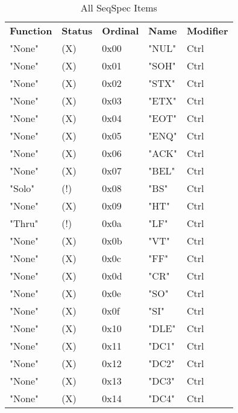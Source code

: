    \begin{table}[htb]
      \centering
      \caption{All SeqSpec Items}
      \label{table:seqspec_items_all}
      \begin{tabular}{l l l l l}
        \textbf{Function} & \textbf{Status} & \textbf{Ordinal} & \textbf{Name} & \textbf{Modifier} \\
        "None"               & (X)  &  0x00   & "NUL"        & Ctrl \\
        "None"               & (X)  &  0x01   & "SOH"        & Ctrl \\
        "None"               & (X)  &  0x02   & "STX"        & Ctrl \\
        "None"               & (X)  &  0x03   & "ETX"        & Ctrl \\
        "None"               & (X)  &  0x04   & "EOT"        & Ctrl \\
        "None"               & (X)  &  0x05   & "ENQ"        & Ctrl \\
        "None"               & (X)  &  0x06   & "ACK"        & Ctrl \\
        "None"               & (X)  &  0x07   & "BEL"        & Ctrl \\
        "Solo"               & (!)  &  0x08   & "BS"         & Ctrl \\
        "None"               & (X)  &  0x09   & "HT"         & Ctrl \\
        "Thru"               & (!)  &  0x0a   & "LF"         & Ctrl \\
        "None"               & (X)  &  0x0b   & "VT"         & Ctrl \\
        "None"               & (X)  &  0x0c   & "FF"         & Ctrl \\
        "None"               & (X)  &  0x0d   & "CR"         & Ctrl \\
        "None"               & (X)  &  0x0e   & "SO"         & Ctrl \\
        "None"               & (X)  &  0x0f   & "SI"         & Ctrl \\
        "None"               & (X)  &  0x10   & "DLE"        & Ctrl \\
        "None"               & (X)  &  0x11   & "DC1"        & Ctrl \\
        "None"               & (X)  &  0x12   & "DC2"        & Ctrl \\
        "None"               & (X)  &  0x13   & "DC3"        & Ctrl \\
        "None"               & (X)  &  0x14   & "DC4"        & Ctrl \\

\end{tabular}
\end{table}
